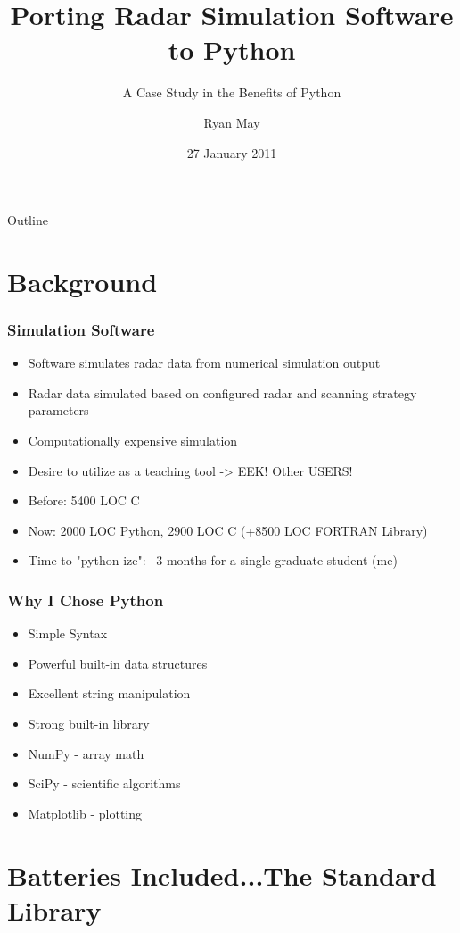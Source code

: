 \documentclass[red, hyperref={pdfpagelabels=false}]{beamer}
\title[Porting Radar DRAFT \today]{Porting Radar Simulation Software to Python}
\subtitle{A Case Study in the Benefits of Python}
\author{Ryan May}
\institute[EEC]{Enterprise Electronics Corporation}
\date{27 January 2011}
\begin{document}
\frame{\titlepage}

\section[Outline]{}
\begin{frame}{Outline}
    \tableofcontents
\end{frame}

\section{Background}
\begin{frame}
  \frametitle{Simulation Software}
  \begin{itemize}
    \item Software simulates radar data from numerical simulation output
    \item Radar data simulated based on configured radar and scanning strategy parameters
    \item Computationally expensive simulation
    \item Desire to utilize as a teaching tool -> EEK! Other USERS!
    \item Before: 5400 LOC C
    \item Now: 2000 LOC Python, 2900 LOC C (+8500 LOC FORTRAN Library)
    \item Time to "python-ize": ~3 months for a single graduate student (me)
  \end{itemize}
\end{frame}

\begin{frame}
  \frametitle{Why I Chose Python}
  \begin{itemize}
    \item Simple Syntax
    \item Powerful built-in data structures
    \item Excellent string manipulation
    \item Strong built-in library
    \item NumPy - array math
    \item SciPy - scientific algorithms
    \item Matplotlib - plotting
  \end{itemize}
\end{frame}

\section{Batteries Included...The Standard Library}
\end{document}
